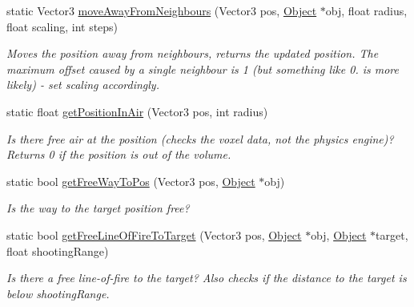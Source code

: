 \begin{DoxyCompactItemize}
\item 
\hypertarget{classAIPositionRating_a426315e060d12975be0df1802647c3b8}{
static \-Vector3 \hyperlink{classAIPositionRating_a426315e060d12975be0df1802647c3b8}{move\-Away\-From\-Neighbours} (\-Vector3 pos, \hyperlink{classObject}{\-Object} $\ast$obj, float radius, float scaling, int steps)}
\label{d8/d90/classAIPositionRating_a426315e060d12975be0df1802647c3b8}

\begin{DoxyCompactList}\small\item\em \-Moves the position away from neighbours, returns the updated position. \-The maximum offset caused by a single neighbour is 1 (but something like 0. is more likely) -\/ set scaling accordingly. \end{DoxyCompactList}\item 
\hypertarget{classAIPositionRating_ad723f60001e82961022f3ce8f111dfff}{
static float \hyperlink{classAIPositionRating_ad723f60001e82961022f3ce8f111dfff}{get\-Position\-In\-Air} (\-Vector3 pos, int radius)}
\label{d8/d90/classAIPositionRating_ad723f60001e82961022f3ce8f111dfff}

\begin{DoxyCompactList}\small\item\em \-Is there free air at the position (checks the voxel data, not the physics engine)? \-Returns 0 if the position is out of the volume. \end{DoxyCompactList}\item 
\hypertarget{classAIPositionRating_a4a66d4c0f0b49216453c8e1ca39c4467}{
static bool \hyperlink{classAIPositionRating_a4a66d4c0f0b49216453c8e1ca39c4467}{get\-Free\-Way\-To\-Pos} (\-Vector3 pos, \hyperlink{classObject}{\-Object} $\ast$obj)}
\label{d8/d90/classAIPositionRating_a4a66d4c0f0b49216453c8e1ca39c4467}

\begin{DoxyCompactList}\small\item\em \-Is the way to the target position free? \end{DoxyCompactList}\item 
\hypertarget{classAIPositionRating_a97bc1f6a55b555935e05ffd057172a86}{
static bool \hyperlink{classAIPositionRating_a97bc1f6a55b555935e05ffd057172a86}{get\-Free\-Line\-Of\-Fire\-To\-Target} (\-Vector3 pos, \hyperlink{classObject}{\-Object} $\ast$obj, \hyperlink{classObject}{\-Object} $\ast$target, float shooting\-Range)}
\label{d8/d90/classAIPositionRating_a97bc1f6a55b555935e05ffd057172a86}

\begin{DoxyCompactList}\small\item\em \-Is there a free line-\/of-\/fire to the target? \-Also checks if the distance to the target is below shooting\-Range. \end{DoxyCompactList}\end{DoxyCompactItemize}


